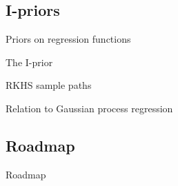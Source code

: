 \subsection{I-priors}
\begin{frame}{Priors on regression functions}
\end{frame}
\begin{frame}{The I-prior}
\end{frame}
\begin{frame}{RKHS sample paths}
\end{frame}
\begin{frame}{Relation to Gaussian process regression}
\end{frame}

\subsection{Roadmap}
\begin{frame}{Roadmap}
\end{frame}